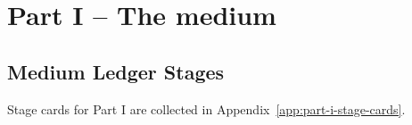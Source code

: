 \part{Part I -- The medium}

\chapter{Medium Ledger Stages}

Stage cards for Part I are collected in Appendix~\ref{app:part-i-stage-cards}.
